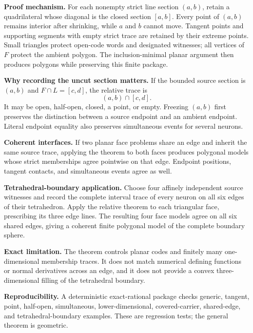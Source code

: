 \documentclass[10pt]{article}
\begin{document}
\textbf{Proof mechanism.}
For each nonempty strict line section $(a,b)$, retain a quadrilateral whose
diagonal is the closed section $[a,b]$.  Every point of $(a,b)$ remains
interior after shrinking, while $a$ and $b$ cannot move.  Tangent points and
supporting segments with empty strict trace are retained by their extreme
points.  Small triangles protect open-code words and designated witnesses;
all vertices of $F$ protect the ambient polygon.  The inclusion-minimal
planar argument then produces polygons while preserving this finite package.

\newpage
\textbf{Why recording the uncut section matters.}
If the bounded source section is $(a,b)$ and $F\cap L=[c,d]$, the relative
trace is
\[
 (a,b)\cap[c,d].
\]
It may be open, half-open, closed, a point, or empty.  Freezing $(a,b)$
first preserves the distinction between a source endpoint and an ambient
endpoint.  Literal endpoint equality also preserves simultaneous events for
several neurons.

\textbf{Coherent interfaces.}
If two planar face problems share an edge and inherit the same source trace,
applying the theorem to both faces produces polygonal models whose strict
memberships agree pointwise on that edge.  Endpoint positions, tangent
contacts, and simultaneous events agree as well.

\begin{center}
\end{center}

\textbf{Tetrahedral-boundary application.}
Choose four affinely independent source witnesses and record the complete
interval trace of every neuron on all six edges of their tetrahedron.  Apply
the relative theorem to each triangular face, prescribing its three edge
lines.  The resulting four face models agree on all six shared edges, giving
a coherent finite polygonal model of the complete boundary sphere.

\textbf{Exact limitation.}
The theorem controls planar codes and finitely many one-dimensional
membership traces.  It does not match numerical defining functions or
normal derivatives across an edge, and it does not provide a convex
three-dimensional filling of the tetrahedral boundary.

\textbf{Reproducibility.}
A deterministic exact-rational package checks generic, tangent, point,
half-open, simultaneous, lower-dimensional, covered-carrier, shared-edge,
and tetrahedral-boundary examples.  These are regression tests; the general
theorem is geometric.
\end{document}
